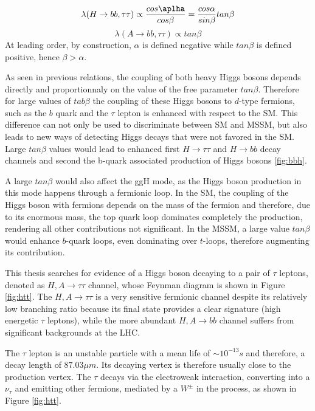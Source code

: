 \begin{equation}
    \lambda(H \rightarrow bb, \tau\tau) \propto \frac{cos \aplha}{cos \beta} = \frac{cos \alpha}{sin \beta} tan \beta
\end{equation}
\begin{equation}
    \lambda(A \rightarrow bb, \tau\tau) \propto tan \beta
\end{equation}
At leading order, by construction, $\alpha$ is defined negative while $tan \beta$ is defined positive, hence $\beta > \alpha$.

As seen in previous relations, the coupling of both heavy Higgs bosons depends directly and proportionnaly on the value of the free parameter $tan \beta$. Therefore for large values of $tab \beta$ the coupling of these Higgs bosons to $d$-type fermions, such as the $b$ quark and the $\tau$ lepton is enhanced with respect to the SM. This difference can not only be used to discriminate between SM and MSSM, but also leads to new ways of detecting Higgs decays that were not favored in the SM. Large $tan \beta$ values would lead to enhanced first $H \rightarrow \tau\tau$ and $H \rightarrow bb$ decay channels and second the b-quark associated production of Higgs bosons \ref{fig:bbh}.

A large $tan \beta$ would also affect the ggH mode, as the Higgs boson production in this mode happens through a fermionic loop. In the SM, the coupling of the Higgs boson with fermions depends on the mass of the fermion and therefore, due to its enormous mass, the top quark loop dominates completely the production, rendering all other contributions not significant. In the MSSM, a large value $tan \beta$ would enhance $b$-quark loops, even dominating over $t$-loops, therefore augmenting its contribution.\newline


This thesis searches for evidence of a Higgs boson decaying to a pair of $\tau$ leptons, denoted as $H, A \rightarrow \tau\tau$ channel, whose Feynman diagram is shown in Figure \ref{fig:htt}. The $H,A \rightarrow \tau\tau$ is a very sensitive fermionic channel despite its relatively low branching ratio because its final state provides a clear signature (high energetic $\tau$ leptons), while the more abundant $H,A \rightarrow bb$ channel suffers from significant backgrounds at the LHC.

The $\tau$ lepton is an unstable particle with a mean life of $\sim 10^{-13} s$ \cite{pdg2016} and therefore, a decay length of $87.03 \mu m$. Its decaying vertex is therefore usually close to the production vertex. The $\tau$ decays via the electroweak interaction, converting into a $\nu_{\tau}$ and emitting other fermions, mediated by a $W^{\pm}$ in the process, as shown in Figure \ref{fig:htt}.

